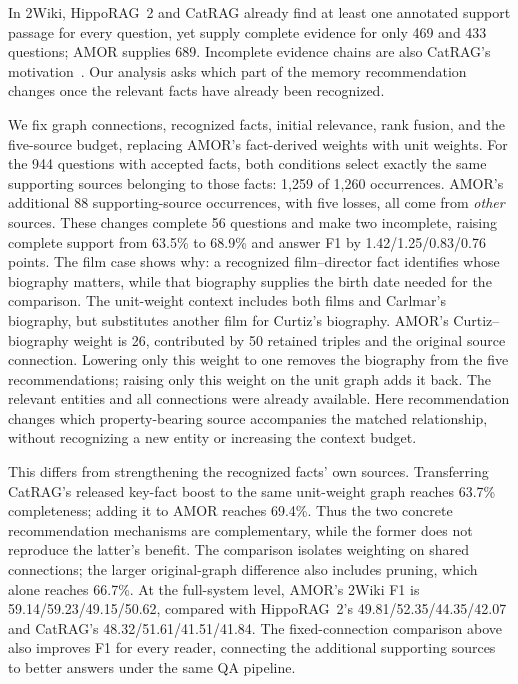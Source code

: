 In 2Wiki, HippoRAG~2 and CatRAG already find at least one annotated support passage for every question, yet supply complete evidence for only 469 and 433 questions; AMOR supplies 689.
Incomplete evidence chains are also CatRAG's motivation~\citep{lau-etal-2026-breaking}.
Our analysis asks which part of the memory recommendation changes once the relevant facts have already been recognized.

We fix graph connections, recognized facts, initial relevance, rank fusion, and the five-source budget, replacing AMOR's fact-derived weights with unit weights.
For the 944 questions with accepted facts, both conditions select exactly the same supporting sources belonging to those facts: 1,259 of 1,260 occurrences.
AMOR's additional 88 supporting-source occurrences, with five losses, all come from \emph{other} sources.
These changes complete 56 questions and make two incomplete, raising complete support from 63.5\% to 68.9\% and answer F1 by 1.42/1.25/0.83/0.76 points.
The film case shows why: a recognized film--director fact identifies whose biography matters, while that biography supplies the birth date needed for the comparison.
The unit-weight context includes both films and Carlmar's biography, but substitutes another film for Curtiz's biography.
AMOR's Curtiz--biography weight is 26, contributed by 50 retained triples and the original source connection.
Lowering only this weight to one removes the biography from the five recommendations; raising only this weight on the unit graph adds it back.
The relevant entities and all connections were already available.
Here recommendation changes which property-bearing source accompanies the matched relationship, without recognizing a new entity or increasing the context budget.

This differs from strengthening the recognized facts' own sources.
Transferring CatRAG's released key-fact boost to the same unit-weight graph reaches 63.7\% completeness; adding it to AMOR reaches 69.4\%.
Thus the two concrete recommendation mechanisms are complementary, while the former does not reproduce the latter's benefit.
The comparison isolates weighting on shared connections; the larger original-graph difference also includes pruning, which alone reaches 66.7\%.
At the full-system level, AMOR's 2Wiki F1 is 59.14/59.23/49.15/50.62, compared with HippoRAG~2's 49.81/52.35/44.35/42.07 and CatRAG's 48.32/51.61/41.51/41.84.
The fixed-connection comparison above also improves F1 for every reader, connecting the additional supporting sources to better answers under the same QA pipeline.

